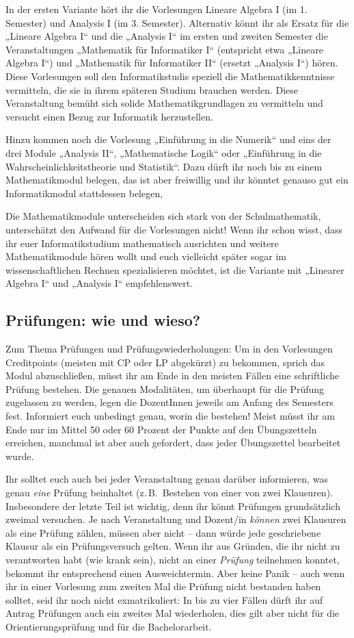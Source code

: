 In der ersten Variante hört ihr die Vorlesungen Lineare Algebra I (im 1.
Semester) und Analysis I (im 3. Semester). Alternativ könnt ihr als Ersatz für
die „Lineare Algebra I“ und die „Analysis I“ im ersten und zweiten Semester die
Veranstaltungen „Mathematik für Informatiker I“ (entspricht etwa „Lineare Algebra I“)
und „Mathematik für Informatiker II“ (ersetzt „Analysis I“) hören.
Diese Vorlesungen soll den Informatikstudis speziell die Mathematikkenntnisse
vermitteln, die sie in ihrem späteren Studium brauchen werden. Diese
Veranstaltung bemüht sich solide
Mathematikgrundlagen zu vermitteln und versucht einen Bezug zur Informatik herzustellen.

Hinzu kommen noch die Vorlesung „Einführung in die Numerik“ und eins der drei Module
„Analysis II“, „Mathematische Logik“ oder „Einführung in die Wahrscheinlichkeitstheorie und Statistik“.
Dazu dürft ihr noch bis zu einem Mathematikmodul belegen, das ist aber freiwillig
und ihr könntet genauso gut ein Informatikmodul stattdessen belegen,

Die Mathematikmodule unterscheiden sich stark von der Schulmathematik,
unterschätzt den Aufwand für die Vorlesungen nicht! Wenn ihr schon wisst, dass
ihr euer Informatikstudium mathematisch ausrichten und weitere Mathematikmodule
hören wollt und euch vielleicht später sogar im wissenschaftlichen Rechnen spezialisieren
möchtet, ist die Variante mit „Linearer Algebra I“ und „Analysis I“ empfehlenswert.


\subsection{Prüfungen: wie und wieso?}

Zum Thema Prüfungen und Prüfungswiederholungen: Um in den Vorlesungen
Creditpoints (meisten mit \gls{CP} oder \gls{LP} abgekürzt) zu bekommen, sprich das Modul abzuschließen,
müsst ihr am Ende in den meisten Fällen eine schriftliche Prüfung bestehen.
Die genauen Modalitäten, um überhaupt für die Prüfung zugelassen zu werden, legen die
DozentInnen jeweils am Anfang des Semesters fest. Informiert euch unbedingt genau,
worin die bestehen! Meist müsst ihr am Ende nur im Mittel 50 oder 60 Prozent
der Punkte auf den Übungszetteln erreichen, manchmal ist aber auch gefordert,
dass jeder Übungszettel bearbeitet wurde.

Ihr solltet euch auch bei jeder Veranstaltung genau darüber informieren, was
genau \emph{eine} Prüfung beinhaltet (z.\,B.\ Bestehen von einer von zwei
Klausuren). Insbesondere der letzte Teil ist wichtig, denn ihr könnt Prüfungen
grundsätzlich zweimal versuchen. Je nach Veranstaltung und Dozent/in
\emph{können} zwei Klausuren als eine Prüfung zählen, müssen aber nicht -- dann
würde jede geschriebene Klausur als ein Prüfungsversuch gelten. Wenn ihr aus
Gründen, die ihr nicht zu verantworten habt (wie krank sein), nicht an einer
\emph{Prüfung} teilnehmen konntet, bekommt ihr entsprechend einen Ausweichtermin.
Aber keine Panik -- auch wenn ihr in einer Vorlesung zum zweiten Mal die
Prüfung nicht bestanden haben solltet, seid ihr noch nicht exmatrikuliert: In
bis zu vier Fällen dürft ihr auf Antrag Prüfungen auch ein zweites Mal
wiederholen, dies gilt aber nicht für die Orientierungsprüfung und für die
Bachelorarbeit.


